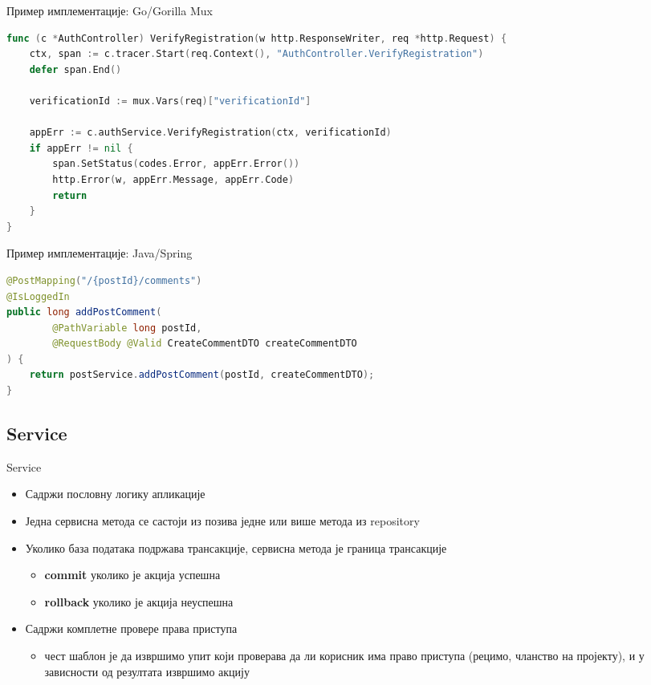 \documentclass{beamer}
\begin{document}
    \begin{frame}[fragile]{Пример имплементације: Go/Gorilla Mux}
    	\begin{adjustbox}{width=\textwidth,height=\textheight,keepaspectratio}
			\begin{lstlisting}[language=go]
func (c *AuthController) VerifyRegistration(w http.ResponseWriter, req *http.Request) {
	ctx, span := c.tracer.Start(req.Context(), "AuthController.VerifyRegistration")
	defer span.End()

	verificationId := mux.Vars(req)["verificationId"]

	appErr := c.authService.VerifyRegistration(ctx, verificationId)
	if appErr != nil {
		span.SetStatus(codes.Error, appErr.Error())
		http.Error(w, appErr.Message, appErr.Code)
		return
	}
}
			\end{lstlisting}
		\end{adjustbox}
    \end{frame}
    
    \begin{frame}[fragile]{Пример имплементације: Java/Spring}
        \begin{adjustbox}{width=\textwidth,height=\textheight,keepaspectratio}
			\begin{lstlisting}[language=java]
@PostMapping("/{postId}/comments")
@IsLoggedIn
public long addPostComment(
		@PathVariable long postId,
		@RequestBody @Valid CreateCommentDTO createCommentDTO
) {
    return postService.addPostComment(postId, createCommentDTO);
}

			\end{lstlisting}
		\end{adjustbox}
    \end{frame}
    
    \subsection{Service}
    
    \begin{frame}{Service}
        \begin{itemize}
			\item Садржи пословну логику апликације
			\item Једна сервисна метода се састоји из позива једне или више метода из repository
			\item Уколико база података подржава трансакције, сервисна метода је граница трансакције
			\begin{itemize}
				\item \textbf{commit} уколико је акција успешна
				\item \textbf{rollback} уколико је акција неуспешна
			\end{itemize}
			\item Садржи комплетне провере права приступа
			\begin{itemize}
				\item чест шаблон је да извршимо упит који проверава да ли корисник има право приступа (рецимо, чланство на пројекту), и у зависности од резултата извршимо акцију
			\end{itemize}
        \end{itemize}
    \end{frame}
    
\end{document}

